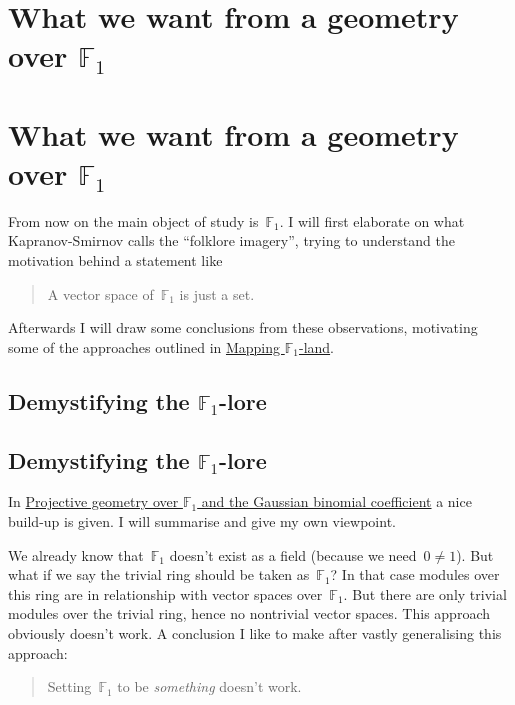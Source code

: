 \iftex
\section{What we want from a geometry over \texorpdfstring{$\mathbb{F}_1$}{F\_1}}
\fi
\ifblog
\section{What we want from a geometry over $\mathbb{F}_1$}
\fi

From now on the main object of study is~$\mathbb{F}_1$. I will first elaborate on what Kapranov-Smirnov calls the ``folklore imagery'', trying to understand the motivation behind a statement like

\begin{quote}
  A vector space of~$\mathbb{F}_1$ is just a set.
\end{quote}

Afterwards I will draw some conclusions from these observations, motivating some of the approaches outlined in \iftex\cite{mapping-fun}\fi\ifblog\href{http://www.neverendingbooks.org/index.php/f_un-and-braid-groups.html}{Mapping $\mathbb{F}_1$-land}\fi.


\iftex
\subsection{Demystifying the \texorpdfstring{$\mathbb{F}_1$}{F\_1}-lore}
\fi
\ifblog
\subsection{Demystifying the $\mathbb{F}_1$-lore}
\fi
In \iftex \cite{projective-geometry-over-f1} \fi\ifblog \href{http://arxiv.org/abs/math/0407093}{Projective geometry over $\mathbb{F}_1$ and the Gaussian binomial coefficient} \fi a nice build-up is given. I will summarise and give my own viewpoint.

We already know that~$\mathbb{F}_1$ doesn't exist as a field (because we need~$0\neq 1$). But what if we say the trivial ring should be taken as~$\mathbb{F}_1$? In that case modules over this ring are in relationship with vector spaces over~$\mathbb{F}_1$. But there are only trivial modules over the trivial ring, hence no nontrivial vector spaces. This approach obviously doesn't work. A conclusion I like to make after vastly generalising this approach:

\begin{quote}
  Setting~$\mathbb{F}_1$ to be \emph{something} doesn't work.
\end{quote}

